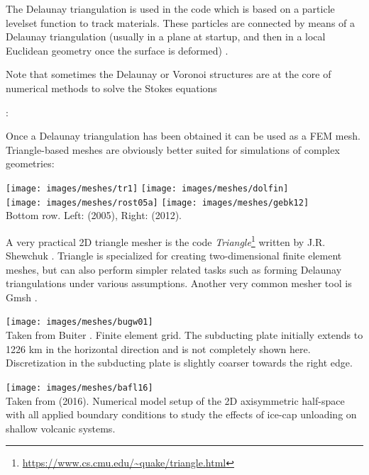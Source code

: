 The Delaunay triangulation is used in the \douar code which is based on a particle levelset 
function to track materials. These particles are connected by means of a Delaunay 
triangulation (usually in a plane at startup, and then in a local Euclidean geometry once 
the surface is deformed) \cite{brtf08}.

Note that sometimes the Delaunay or Voronoi structures are at the core of 
numerical methods to solve the Stokes equations \cite{brsa95,hust08b}

\Literature: \textcite{gebo}\\
\textcite{vemm09}


Once a Delaunay triangulation has been obtained it can be used as a FEM mesh.  
Triangle-based meshes are obviously better suited for simulations of complex geometries:
\begin{center}
\texttt{[image: images/meshes/tr1]}
\texttt{[image: images/meshes/dolfin]}\\
\texttt{[image: images/meshes/rost05a]}
\texttt{[image: images/meshes/gebk12]}\\
{\captionfont Bottom row. Left: \textcite{rost05a} (2005),
Right: \textcite{gebk12} (2012).}
\end{center}

A very practical 2D triangle mesher is the 
code {\sl Triangle}\footnote{\url{https://www.cs.cmu.edu/~quake/triangle.html}}
written by J.R. Shewchuk \cite{shew96,shew02,shew14}.
Triangle is specialized for creating two-dimensional finite element meshes, but can 
also perform simpler related tasks such as forming Delaunay triangulations under various assumptions.
Another very common mesher tool is Gmsh \cite{gere09}.

\begin{center}
\texttt{[image: images/meshes/bugw01]}\\
{\captionfont Taken from Buiter \etal \cite{bugw01}. Finite element grid. 
The subducting plate initially extends to 1226 km in the horizontal direction and 
is not completely shown here. Discretization in the subducting plate is slightly coarser 
towards the right edge.}
\end{center}

\begin{center}
\texttt{[image: images/meshes/bafl16]}\\
{\captionfont Taken from \textcite{bafl16} (2016). 
Numerical model setup of the 2D axisymmetric half-space with all applied 
boundary conditions to study the effects of ice-cap unloading
on shallow volcanic systems.}
\end{center}


